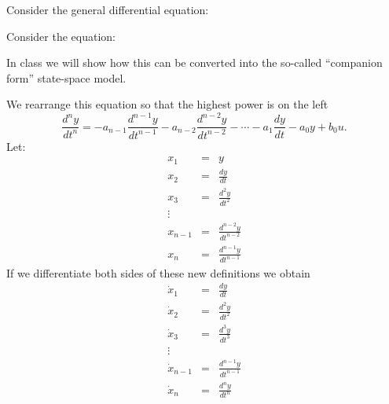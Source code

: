 Consider the general differential equation:
\ifslidesonly
\begin{slide}
Consider the equation:


In class we will show how this can be converted into the so-called ``companion form''
state-space model.
\end{slide}
\fi

We rearrange this equation so that the highest power is on the
left
\[
\frac{d^{n}y}{dt^{n}} =
-a_{n-1}\frac{d^{n-1}y}{dt^{n-1}}-a_{n-2}\frac{d^{n-2}y}{dt^{n-2}}-\cdots-a_1\frac{dy}{dt}-a_0
y + b_0 u.
\]
Let:
\begin{eqnarray*}
x_1 &=& y \\ x_2 &=& \frac{dy}{dt} \\ x_3 & = & \frac{d^2y}{dt^2}
\\ \vdots \\ x_{n-1} &=& \frac{d^{n-2}y}{dt^{n-2}} \\ x_{n} &=& \frac{d^{n-1}y}{dt^{n-1}}
\end{eqnarray*}
If we differentiate both sides of these new definitions we obtain
\begin{eqnarray*}
\dot{x}_1 &=& \frac{dy}{dt} \\ \dot{x}_2 &=& \frac{d^2y}{dt^2} \\
\dot{x}_3 & = & \frac{d^3y}{dt^3}
\\ \vdots \\ \dot{x}_{n-1}  &=& \frac{d^{n-1}y}{dt^{n-1}} \\ \dot{x}_{n} &=& \frac{d^{n}y}{dt^{n}}
\end{eqnarray*}

